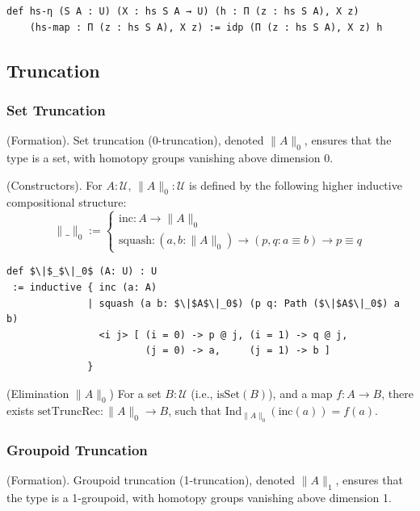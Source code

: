 \documentclass{article}
\begin{document}
\begin{lstlisting}[mathescape=true]
def hs-η (S A : U) (X : hs S A → U) (h : Π (z : hs S A), X z)
    (hs-map : Π (z : hs S A), X z) := idp (Π (z : hs S A), X z) h
\end{lstlisting}



\newpage
\subsection{Truncation}
\subsubsection*{Set Truncation}
\begin{definition} (Formation).
Set truncation (0-truncation), denoted \( \| A \|_0 \),
ensures that the type is a set, with homotopy groups vanishing above dimension 0.
\end{definition}

\begin{definition} (Constructors).
For \( A : \mathcal{U} \), \( \| A \|_0 : \mathcal{U} \) is defined by the following higher
inductive compositional structure:
\[
\| \_ \|_0 :=
\begin{cases}
\text{inc} : A \to \| A \|_0 \\
\text{squash} : (a, b : \| A \|_0) \to (p, q : a \equiv b) \to p \equiv q
\end{cases}
\]
\begin{lstlisting}[mathescape=true]
def $\|$_$\|_0$ (A: U) : U
 := inductive { inc (a: A)
              | squash (a b: $\|$A$\|_0$) (p q: Path ($\|$A$\|_0$) a b)
                <i j> [ (i = 0) -> p @ j, (i = 1) -> q @ j,
                        (j = 0) -> a,     (j = 1) -> b ]
              }
\end{lstlisting}
\end{definition}

\begin{theorem} (Elimination \( \| A \|_0 \))
For a set \( B : \mathcal{U} \) (i.e., \( \text{isSet}(B) \)), and a map \( f : A \to B \),
there exists \( \text{setTruncRec} : \| A \|_0 \to B \), such that \( \text{Ind}_{\|A\|_0}(\text{inc}(a)) = f(a) \).
\end{theorem}

\subsubsection*{Groupoid Truncation}
\begin{definition} (Formation).
Groupoid truncation (1-truncation), denoted \( \| A \|_1 \), ensures that
the type is a 1-groupoid, with homotopy groups vanishing above dimension 1.
\end{definition}
\end{document}
